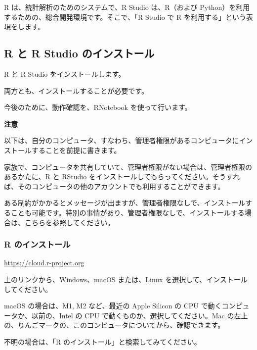\documentclass[
]{bxjsbook}
\theoremstyle{definition}
\theoremstyle{definition}
\theoremstyle{definition}
\theoremstyle{definition}
\theoremstyle{remark}
\begin{document}
R は、統計解析のためのシステムで、R Studio は、R（および Python）を利用するための、総合開発環境です。そこで、「R Studio で R を利用する」という表現をします。

\hypertarget{r-ux3068-r-studio-ux306eux30a4ux30f3ux30b9ux30c8ux30fcux30eb}{%
\subsection{R と R Studio のインストール}\label{r-ux3068-r-studio-ux306eux30a4ux30f3ux30b9ux30c8ux30fcux30eb}}

R と R Studio をインストールします。

両方とも、インストールすることが必要です。

今後のために、動作確認を、RNotebook を使って行います。

\textbf{注意}

以下は、自分のコンピュータ、すなわち、管理者権限があるコンピュータにインストールすることを前提に書きます。

家族で、コンピュータを共有していて、管理者権限がない場合は、管理者権限のあるかたに、R と RStudio をインストールしてもらってください。そうすれば、そのコンピュータの他のアカウントでも利用することができます。

ある制約がかかるとメッセージが出ますが、管理者権限なしで、インストールすることも可能です。特別の事情があり、管理者権限なしで、インストールする場合は、\href{https://icu-hsuzuki.github.io/myds/techmemo.html\#\%E9\%9D\%9E\%E7\%AE\%A1\%E7\%90\%86\%E8\%80\%85\%E3\%81\%A8\%E3\%81\%97\%E3\%81\%A6-r-\%E3\%81\%A8-rstudio-\%E3\%82\%92\%E3\%82\%A4\%E3\%83\%B3\%E3\%82\%B9\%E3\%83\%88\%E3\%83\%BC\%E3\%83\%AB}{こちら}を参照してください。

\hypertarget{r-ux306eux30a4ux30f3ux30b9ux30c8ux30fcux30eb}{%
\subsubsection{R のインストール}\label{r-ux306eux30a4ux30f3ux30b9ux30c8ux30fcux30eb}}

\url{https://cloud.r-project.org}

上のリンクから、Windows、macOS または、Linux を選択して、インストールしてください。

macOS の場合は、M1, M2 など、最近の Apple Silicon の CPU で動くコンピュータか、以前の、Intel の CPU で動くものか、選択してください。Mac の左上の、りんごマークの、このコンピュータについてから、確認できます。

不明の場合は、「R のインストール」と検索してみてください。
\end{document}

